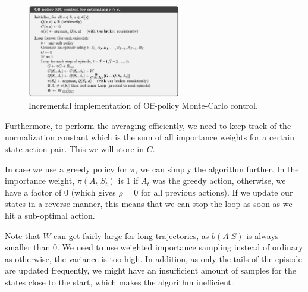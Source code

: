 \begin{itemize}
	\begin{figure}[ht!]
		\centering
		\includegraphics[width=0.6\textwidth]{figures/rl_tabular_methods_offpolicy_MC_control.png}
		\caption{Incremental implementation of Off-policy Monte-Carlo control.}
		\label{fig:rl_tabular_methods_offpolicy_MC_control}
	\end{figure}
	
	Furthermore, to perform the averaging efficiently, we need to keep track of the normalization constant which is the sum of all importance weights for a certain state-action pair. This we will store in $C$. 
	
	In case we use a greedy policy for $\pi$, we can simply the algorithm further. In the importance weight, $\pi(A_t|S_t)$ is 1 if $A_t$ was the greedy action, otherwise, we have a factor of 0 (which gives $\rho=0$ for all previous actions). If we update our states in a reverse manner, this means that we can stop the loop as soon as we hit a sub-optimal action. 
	
	Note that $W$ can get fairly large for long trajectories, as $b(A|S)$ is always smaller than 0. We need to use weighted importance sampling instead of ordinary as otherwise, the variance is too high. In addition, as only the tails of the episode are updated frequently, we might have an insufficient amount of samples for the states close to the start, which makes the algorithm inefficient.
	
	
\end{itemize}
